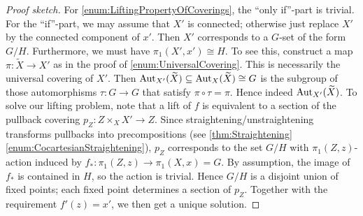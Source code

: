 \begin{proof}[Proof sketch]
	For \cref{enum:LiftingPropertyOfCoverings}, the \enquote{only if}-part is trivial. For the \enquote{if}-part, we may assume that $X'$ is connected; otherwise just replace $X'$ by the connected component of $x'$. Then $X'$ corresponds to a $G$-set of the form $G/H$. Furthermore, we must have $\pi_1(X',x')\cong H$. To see this, construct a map $\pi\colon \widetilde{X}\rightarrow X'$ as in the proof of \cref{enum:UniversalCovering}. This is necessarily the universal covering of $X'$. Then $\operatorname{Aut}_{X'}(\widetilde{X})\subseteq \operatorname{Aut}_X(\widetilde{X})\cong G$ is the subgroup of those automorphisms $\tau\colon G\rightarrow G$ that satisfy $\pi\circ\tau=\pi$. Hence indeed $\operatorname{Aut}_{X'}(\widetilde{X})$. To solve our lifting problem, note that a lift of $f$ is equivalent to a section of the pullback covering $p_Z\colon Z\times_XX'\rightarrow Z$. Since straightening/unstraightening transforms pullbacks into precompositions (see \cref{thm:Straightening}\cref{enum:CocartesianStraightening}), $p_Z$ corresponds to the set $G/H$ with $\pi_1(Z,z)$-action induced by $f_*\colon \pi_1(Z,z)\rightarrow \pi_1(X,x)=G$. By assumption, the image of $f_*$ is contained in $H$, so the action is trivial. Hence $G/H$ is a disjoint union of fixed points; each fixed point determines a section of $p_Z$. Together with the requirement $f'(z)=x'$, we then get a unique solution.
\end{proof}

